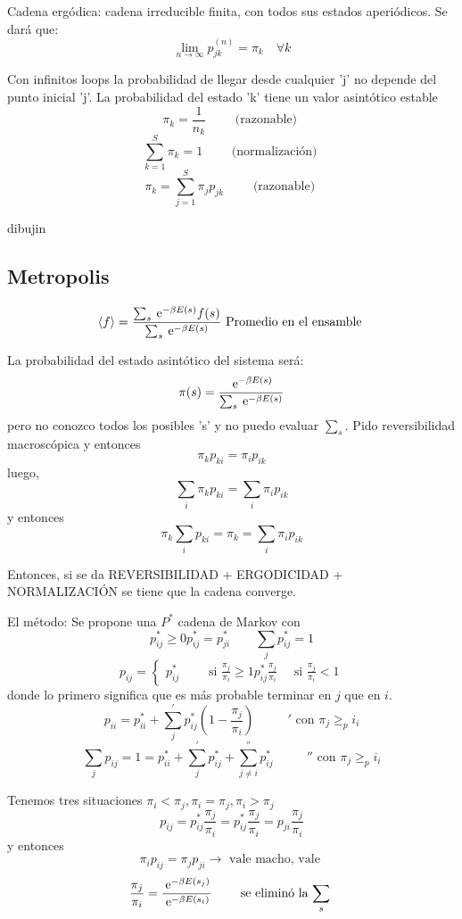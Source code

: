 \documentclass[10pt,oneside]{CBFT_book}
\begin{document}
Cadena ergódica: cadena irreducible finita, con todos sus estados aperiódicos. 
Se dará que:
\[
	\boxed{ \lim_{n\to\infty} p_{jk}^{(n)} = \pi_k \quad \forall k }
\]

Con infinitos loops la probabilidad de llegar desde cualquier 'j' no depende del punto inicial 'j'.
La probabilidad del estado 'k' tiene un valor asintótico estable
\[
	\pi_k = \frac{1}{n_k} \qquad \text{ (razonable) } 
\]
\[
	\sum_{k=1}^S \pi_k = 1 \qquad \text{ (normalización) } 
\]
\[
	\pi_k = \sum_{j=1}^S \pi_j p_{jk}  \qquad \text{ (razonable) } 
\]

dibujin

\subsection{Metropolis}

\[
	\braket{f} = \frac{\sum_s \:\mathrm{e}^{-\beta E(s)} f(s) }{\sum_s \:\mathrm{e}^{-\beta E(s)} } 
	\text{ Promedio en el ensamble } 
\]

La probabilidad del estado asintótico del sistema será:
\[
	\pi(s) = \frac{ \:\mathrm{e}^{-\beta E(s)} }{\sum_s \:\mathrm{e}^{-\beta E(s)} } 
\]
pero no conozco todos los posibles 's' y no puedo evaluar $\sum_s$.
Pido reversibilidad macroscópica y entonces
\[
	\pi_k p_{ki} = \pi_i p_{ik}
\]
luego,
\[
	\sum_i \pi_k p_{ki} = \sum_i \pi_i p_{ik}
\]
y entonces
\[
	\pi_k \sum_i  p_{ki} = \pi_k = \sum_i \pi_i p_{ik}
\]

Entonces, si se da 
REVERSIBILIDAD + ERGODICIDAD + NORMALIZACIÓN
se tiene que la cadena converge.

El método:
Se propone una $P^*$ cadena de Markov con 
\[
	p_{ij}^* \geq 0 p_{ij}^* = p_{ji}^* \qquad \sum_j p_{ij}^* = 1
\]
\[
	p_{ij} = \begin{cases}
	          p_{ij}^*	\quad \quad \text{ si }  \frac{\pi_j}{\pi_i} \geq 1
	          p_{ij}^*\frac{\pi_j}{\pi_i} \quad \text{ si }  \frac{\pi_j}{\pi_i}< 1
	         \end{cases}
\]
donde lo primero significa que es más probable terminar en $j$ que en $i$.
\[
	p_{ii} = p_{ii}^* + \sum_j^{'} p_{ij}^*( 1 - \frac{\pi_j}{\pi_i} ) \qquad 
	\text{ $'$ con } \pi_j \geq _pi_i 
\]
\[
	\sum_j p_{ij} = 1 = p_{ii}^* + \sum_j^{'} p_{ij}^*  + \sum_{j\neq i}^{''} p_{ij}^* \qquad 
	\text{ $''$ con } \pi_j \geq _pi_i 
\]

Tenemos tres situaciones $ \pi_i < \pi_j , \pi_i = \pi_j, \pi_i > \pi_j$
\[
	p_{ij} = p_{ij}^* \frac{\pi_j}{\pi_i} = p_{ij}^*\frac{\pi_j}{\pi_i} = p_{ji} \frac{\pi_j}{\pi_i}
\]
y entonces
\[
	\pi_i p_{ij} = \pi_j p_{ji} \to \text{ vale macho, vale }
\]
\[
	\frac{\pi_j}{\pi_i} = \frac{\:\mathrm{e}^{-\beta E(s_j)}}{\:\mathrm{e}^{-\beta E(s_i)}} 
	\qquad \text{ se eliminó la $\sum_s$ }
\]
\end{document}
